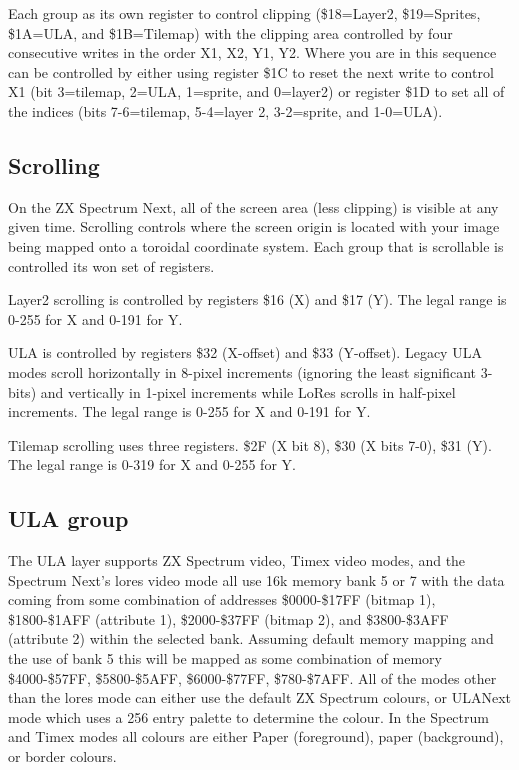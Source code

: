 Each group as its own register to control clipping (\$18=Layer2,
\$19=Sprites, \$1A=ULA, and \$1B=Tilemap) with the clipping area
controlled by four consecutive writes in the order X1, X2, Y1,
Y2. Where you are in this sequence can be controlled by either using
register \$1C to reset the next write to control X1 (bit 3=tilemap,
2=ULA, 1=sprite, and 0=layer2) or register \$1D to set all of the
indices (bits 7-6=tilemap, 5-4=layer 2, 3-2=sprite, and 1-0=ULA).

\subsection{Scrolling}

On the ZX Spectrum Next, all of the screen area (less clipping) is
visible at any given time. Scrolling controls where the screen origin
is located with your image being mapped onto a toroidal coordinate
system. Each group that is scrollable is controlled its won set of
registers.

Layer2 scrolling is controlled by registers \$16 (X) and \$17 (Y). The
legal range is 0-255 for X and 0-191 for Y.

ULA is controlled by registers \$32 (X-offset) and \$33
(Y-offset). Legacy ULA modes scroll horizontally in 8-pixel increments
(ignoring the least significant 3-bits) and vertically in 1-pixel
increments while LoRes scrolls in half-pixel increments. The legal
range is 0-255 for X and 0-191 for Y.

Tilemap scrolling uses three registers. \$2F (X bit 8), \$30 (X bits
7-0), \$31 (Y). The legal range is 0-319 for X and 0-255 for Y.

\subsection{ULA group}

The ULA layer supports ZX Spectrum video, Timex video modes, and the
Spectrum Next’s lores video mode all use 16k memory bank 5 or 7 with
the data coming from some combination of addresses \$0000-\$17FF
(bitmap 1), \$1800-\$1AFF (attribute 1), \$2000-\$37FF (bitmap 2), and
\$3800-\$3AFF (attribute 2) within the selected bank.  Assuming
default memory mapping and the use of bank 5 this will be mapped as
some combination of memory \$4000-\$57FF, \$5800-\$5AFF,
\$6000-\$77FF, \$780-\$7AFF. All of the modes other than the lores
mode can either use the default ZX Spectrum colours, or ULANext mode
which uses a 256 entry palette to determine the colour. In the
Spectrum and Timex modes all colours are either Paper (foreground),
paper (background), or border colours.

